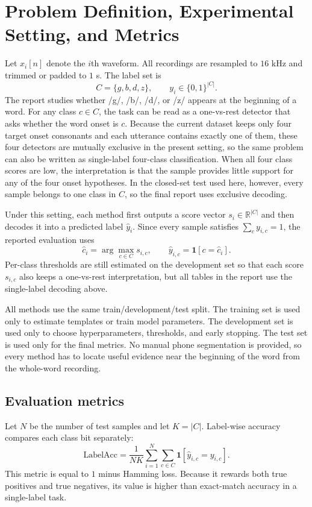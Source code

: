 \section{Problem Definition, Experimental Setting, and Metrics}

Let $x_i[n]$ denote the $i$th waveform. All recordings are resampled to $16$ kHz and trimmed or padded to $1$ s. The label set is
\[
C=\{g,b,d,z\}, \qquad y_i\in\{0,1\}^{|C|}.
\]
The report studies whether /g/, /b/, /d/, or /z/ appears at the beginning of a word. For any class $c\in C$, the task can be read as a one-vs-rest detector that asks whether the word onset is $c$. Because the current dataset keeps only four target onset consonants and each utterance contains exactly one of them, these four detectors are mutually exclusive in the present setting, so the same problem can also be written as single-label four-class classification. When all four class scores are low, the interpretation is that the sample provides little support for any of the four onset hypotheses. In the closed-set test used here, however, every sample belongs to one class in $C$, so the final report uses exclusive decoding.

Under this setting, each method first outputs a score vector $s_i\in\mathbb{R}^{|C|}$ and then decodes it into a predicted label $\hat y_i$. Since every sample satisfies $\sum_c y_{i,c}=1$, the reported evaluation uses
\[
\hat c_i=\arg\max_{c\in C}s_{i,c},\qquad
\hat y_{i,c}=\mathbf{1}[c=\hat c_i].
\]
Per-class thresholds are still estimated on the development set so that each score $s_{i,c}$ also keeps a one-vs-rest interpretation, but all tables in the report use the single-label decoding above.

All methods use the same train/development/test split. The training set is used only to estimate templates or train model parameters. The development set is used only to choose hyperparameters, thresholds, and early stopping. The test set is used only for the final metrics. No manual phone segmentation is provided, so every method has to locate useful evidence near the beginning of the word from the whole-word recording.

\subsection{Evaluation metrics}

Let $N$ be the number of test samples and let $K=|C|$. Label-wise accuracy compares each class bit separately:
\[
\mathrm{LabelAcc}
=\frac{1}{NK}\sum_{i=1}^{N}\sum_{c\in C}\mathbf{1}[\hat y_{i,c}=y_{i,c}].
\]
This metric is equal to $1$ minus Hamming loss. Because it rewards both true positives and true negatives, its value is higher than exact-match accuracy in a single-label task.

